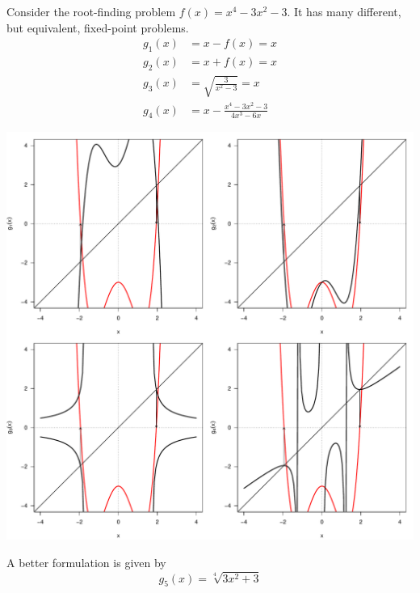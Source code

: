 \documentclass[11pt]{article}
\begin{document}
Consider the root-finding problem \(f(x) = x^4-3x^2-3\). It has many different, but equivalent, fixed-point problems.
\begin{align*}
g_1(x) & = x- f(x) = x\\
g_2(x) & = x+f(x) = x\\
g_3(x) & = \sqrt{\frac{3}{x^2-3}} = x\\
g_4(x) & = x - \frac{x^4-3x^2-3}{4x^3-6x}
\end{align*}

\begin{center}
\includegraphics[width=\textwidth]{bad.pdf}
\end{center}

\newpage
A better formulation is given by \[g_5(x) = \sqrt[4]{3x^2+3}\]
\end{document}
